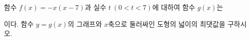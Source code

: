 함수 $f(x)=-x(x-7)$과 실수 $t\ (0<t<7)$에 대하여 함수 $g(x)$는 \par\smallskip{}\par\smallskip\noindent 이다. 함수 $y=g(x)$의 그래프와 $x$축으로 둘러싸인 도형의 넓이의 최댓값을 구하시오.
